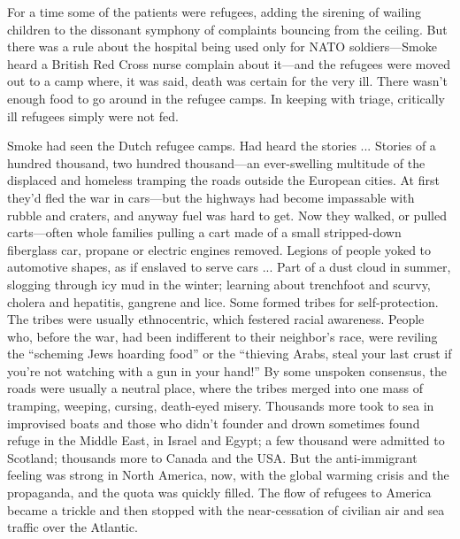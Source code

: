 For a time some of the patients were refugees, adding the sirening of wailing children to the dissonant symphony of complaints bouncing from the ceiling. But there was a rule about the hospital being used only for NATO soldiers—Smoke heard a British Red Cross nurse complain about it—and the refugees were moved out to a camp where, it was said, death was certain for the very ill. There wasn't enough food to go around in the refugee camps. In keeping with triage, critically ill refugees simply were not fed.

Smoke had seen the Dutch refugee camps. Had heard the stories ... Stories of a hundred thousand, two hundred thousand—an ever-swelling multitude of the displaced and homeless tramping the roads outside the European cities. At first they'd fled the war in cars—but the highways had become impassable with rubble and craters, and anyway fuel was hard to get. Now they walked, or pulled carts—often whole families pulling a cart made of a small stripped-down fiberglass car, propane or electric engines removed. Legions of people yoked to automotive shapes, as if enslaved to serve cars ... Part of a dust cloud in summer, slogging through icy mud in the winter; learning about trenchfoot and scurvy, cholera and hepatitis, gangrene and lice. Some formed tribes for self-protection. The tribes were usually ethnocentric, which festered racial awareness. People who, before the war, had been indifferent to their neighbor's race, were reviling the ``scheming Jews hoarding food'' or the ``thieving Arabs, steal your last crust if you're not watching with a gun in your hand!'' By some unspoken consensus, the roads were usually a neutral place, where the tribes merged into one mass of tramping, weeping, cursing, death-eyed misery. Thousands more took to sea in improvised boats and those who didn't founder and drown sometimes found refuge in the Middle East, in Israel and Egypt; a few thousand were admitted to Scotland; thousands more to Canada and the USA. But the anti-immigrant feeling was strong in North America, now, with the global warming crisis and the propaganda, and the quota was quickly filled. The flow of refugees to America became a trickle and then stopped with the near-cessation of civilian air and sea traffic over the Atlantic.

